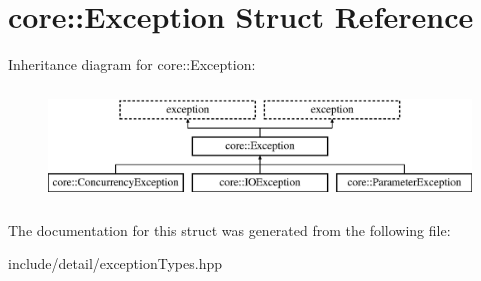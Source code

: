 \hypertarget{structcore_1_1_exception}{\section{core\-:\-:Exception Struct Reference}
\label{structcore_1_1_exception}
}
Inheritance diagram for core\-:\-:Exception\-:\begin{figure}[H]
\begin{center}
\leavevmode
\includegraphics[height=3.000000cm]{structcore_1_1_exception}
\end{center}
\end{figure}


The documentation for this struct was generated from the following file\-:\begin{DoxyCompactItemize}
\item 
include/detail/exception\-Types.\-hpp\end{DoxyCompactItemize}
